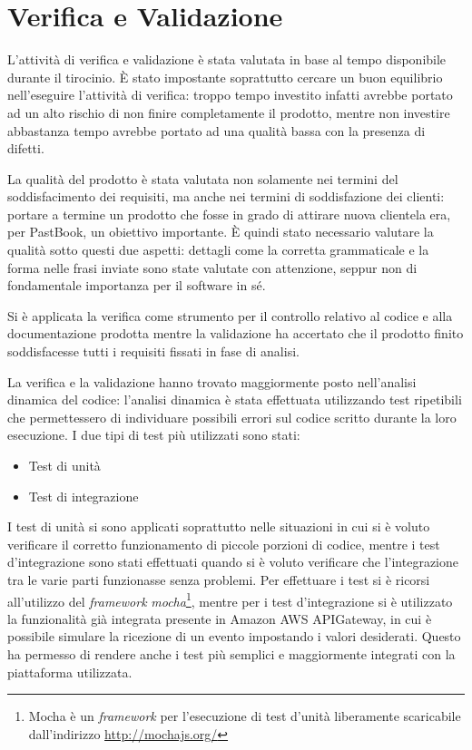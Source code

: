 
\chapter{Verifica e Validazione}

L'attività di verifica e validazione è stata valutata in base al tempo
disponibile durante il tirocinio. È stato impostante soprattutto cercare un
buon equilibrio nell'eseguire l'attività di verifica: troppo tempo investito
infatti avrebbe portato ad un alto rischio di non finire completamente il
prodotto, mentre non investire abbastanza tempo avrebbe portato ad una qualità
bassa con la presenza di difetti.

La qualità del prodotto è stata valutata non solamente nei termini del
soddisfacimento dei requisiti, ma anche nei termini di soddisfazione dei
clienti: portare a termine un prodotto che fosse in grado di attirare nuova
clientela era, per PastBook, un obiettivo importante. È quindi stato necessario
valutare la qualità sotto questi due aspetti: dettagli come la corretta
grammaticale e la forma nelle frasi inviate sono state valutate con attenzione,
seppur non di fondamentale importanza per il software in sé.

Si è applicata la verifica come strumento per il controllo relativo
al codice e alla documentazione prodotta mentre la validazione ha accertato
che il prodotto finito soddisfacesse tutti i requisiti fissati in fase di
analisi.

La verifica e la validazione hanno trovato maggiormente posto nell'analisi
dinamica del codice: l'analisi dinamica è stata effettuata utilizzando test
ripetibili che permettessero di individuare possibili errori sul codice
scritto durante la loro esecuzione.
I due tipi di test più utilizzati sono stati:
\begin{itemize}
  \item Test di unità
  \item Test di integrazione
\end{itemize}
I test di unità si sono applicati soprattutto nelle situazioni in cui si è
voluto verificare il corretto funzionamento di piccole porzioni di codice,
mentre i test d'integrazione sono stati effettuati quando si è voluto
verificare che l'integrazione tra le varie parti funzionasse senza problemi.
Per effettuare i test si è ricorsi all'utilizzo del \textit{framework}
\textit{mocha}\footnote{Mocha è un \textit{framework} per l'esecuzione di test
d'unità liberamente scaricabile dall'indirizzo \url{http://mochajs.org/}},
mentre per i test d'integrazione si è utilizzato la funzionalità già integrata
presente in Amazon AWS APIGateway, in cui è possibile simulare la ricezione di
un evento impostando i valori desiderati. Questo ha permesso di rendere anche i
test più semplici e maggiormente integrati con la piattaforma utilizzata.

